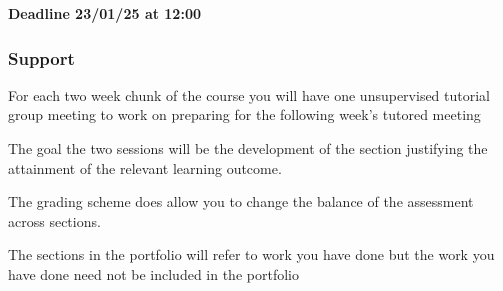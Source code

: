\documentclass{article}
\begin{document}
\textbf{Deadline 23/01/25 at 12:00}

\subsubsection{Support}

For each two week chunk of the course you will have one unsupervised tutorial group meeting to work on preparing for the following week's tutored meeting

The goal the two sessions will be the development of the section justifying the attainment of the relevant learning outcome.

The grading scheme does allow you to change the balance of the assessment across sections.

The sections in the portfolio will refer to work you have done but the work you have done need not be included in the portfolio
\end{document}
